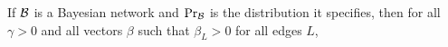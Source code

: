 \documentclass{article}
\begin{document}
		
	 	  If $\cal B$ is a Bayesian network
	          and $\Pr_{\cal B}$ is the distribution it specifies, then
	        for all $\gamma > 0$ and all vectors $\beta$ such
	        that $\beta_L > 0$ for all edges $L$,
\end{document}
